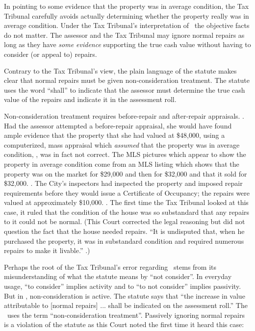 \documentclass[12pt,\documentclassflag]{michiganCourtOfAppealsBrief}
\begin{document}
In pointing to some evidence that the property was in average condition, the Tax Tribunal carefully avoids actually determining whether the property really was in average condition. Under the Tax Tribunal's interpretation of \mathieuGast\ the objective facts do not matter. The assessor and the Tax Tribunal may ignore normal repairs as long as they have \textit{some evidence} supporting the true cash value without having to consider (or appeal to) repairs.

Contrary to the Tax Tribunal's view, the plain language of the statute makes clear that normal repairs must be given non-consideration treatment. The statute uses the word ``shall'' to indicate that the assessor must determine the true cash value of the repairs and indicate it in the assessment roll.

Non-consideration treatment requires before-repair and after-repair appraisals. . Had the assessor attempted a before-repair appraisal, she would have found ample evidence that the property that she had valued at \$48,000, using a computerized, mass appraisal which \textit{assumed} that the property was in average condition, \foj[4], was in fact not correct. The MLS pictures which appear to show the property in average condition come from an MLS listing which shows that the property was on the market for \$29,000 and then for \$32,000 and that it sold for \$32,000. \mlsHistory[]. The City's inspectors had inspected the property and imposed repair requirements before they would issue a Certificate of Occupancy; the repairs were valued at approximately \$10,000. \repairs. The first time the Tax Tribunal looked at this case, it ruled that the condition of the house was so substandard that any repairs to it could not be normal. (This Court corrected the legal reasoning but did not question the fact that the house needed repairs. ``It is undisputed that, when he purchased the property, it was in substandard condition and required numerous repairs to make it livable.'' .)
 
Perhaps the root of the Tax Tribunal's error regarding \mathieuGast\ stems from its misunderstanding of what the statute means by ``not consider''. In everyday usage, ``to consider'' implies activity and to ``to not consider'' implies passivity. But in \mathieuGast, non-consideration is active. The statute says that ``the increase in value attributable to [normal repairs] ... shall be indicated on the assessment roll.'' The \cite[s]{STC Bulletin 7 of 2014}\ uses the term ``non-consideration treatment''. Passively ignoring normal repairs is a violation of the statute as this Court noted the first time it heard this case:
\end{document}
